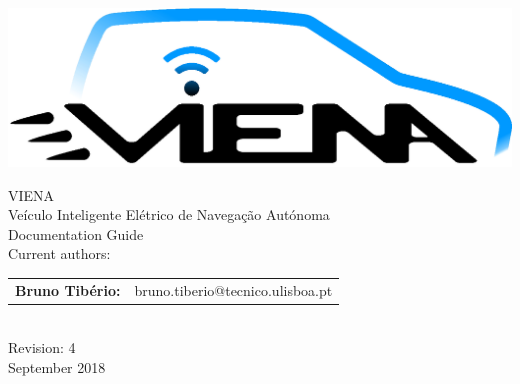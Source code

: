 \begin{center}
%
\vspace{3cm}
\includegraphics[width=0.7\linewidth]{figures/VIENA-Logo.eps}

\vspace{1.0cm}
{\FontLb VIENA} \\ {\FontMn Veículo Inteligente Elétrico de Navegação Autónoma}\\ %
\vspace{0.2cm}
{\FontMn Documentation Guide} \\
\vfill
{\FontMb Current authors:}\\
\begin{tabular}{cl}
	\textbf{Bruno Tibério:} & bruno.tiberio@tecnico.ulisboa.pt \hfill         \\
\end{tabular} 
\\
\vfill
{\FontMb Revision: 4}\\
\vspace{0.5cm}
{\FontMb September 2018} \\
%
\end{center}
